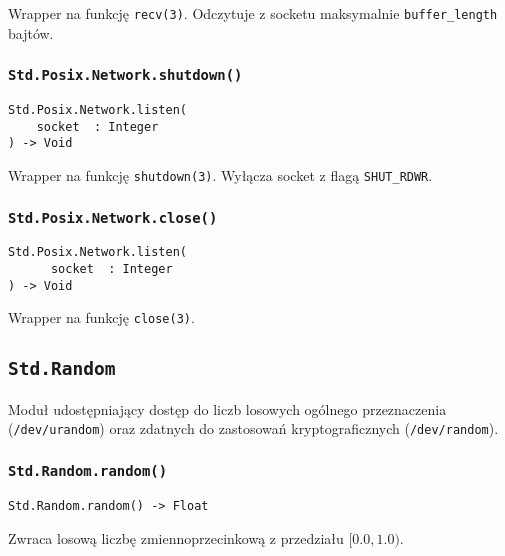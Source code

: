 Wrapper na funkcję \texttt{recv(3)}. Odczytuje z socketu maksymalnie \texttt{buffer\_length} bajtów.

\subsubsection{\texttt{Std.Posix.Network.shutdown()}}

\begin{small}
\begin{lstlisting}
Std.Posix.Network.listen(
    socket  : Integer
) -> Void
\end{lstlisting}
\end{small}

Wrapper na funkcję \texttt{shutdown(3)}.
Wyłącza socket z flagą \texttt{SHUT\_RDWR}.

\subsubsection{\texttt{Std.Posix.Network.close()}}

\begin{small}
\begin{lstlisting}
Std.Posix.Network.listen(
      socket  : Integer
) -> Void
\end{lstlisting}
\end{small}

Wrapper na funkcję \texttt{close(3)}.


\subsection{\texttt{Std.Random}}
\label{stdlib_Std_Random}

Moduł udostępniający dostęp do liczb losowych ogólnego przeznaczenia (\texttt{/dev/urandom}) oraz zdatnych do
zastosowań kryptograficznych (\texttt{/dev/random}).

\subsubsection{\texttt{Std.Random.random()}}

\begin{small}
\begin{lstlisting}
Std.Random.random() -> Float
\end{lstlisting}
\end{small}

Zwraca losową liczbę zmiennoprzecinkową z przedziału $[0.0, 1.0)$.

